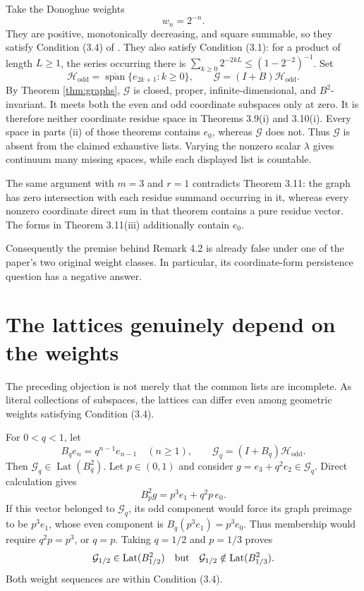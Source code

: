 \documentclass[11pt]{article}
\newcommand{\Hh}{\mathcal H}
\newcommand{\Gg}{\mathcal G}
\newcommand{\Lat}{\operatorname{Lat}}
\begin{document}
Take the Donoghue weights
\[
 w_n=2^{-n}.
\]
They are positive, monotonically decreasing, and square summable, so they
satisfy Condition (3.4) of \cite{LPS}.  They also satisfy Condition (3.1):
for a product of length $L\geq1$, the series occurring there is
$\sum_{k\geq0}2^{-2kL}\leq(1-2^{-2})^{-1}$.  Set
\[
 \Hh_{\mathrm{odd}}=\overline{\operatorname{span}}\{e_{2k+1}:k\geq0\},
 \qquad \Gg=(I+B)\Hh_{\mathrm{odd}}.
\]
By Theorem \ref{thm:graphs}, $\Gg$ is closed, proper,
infinite-dimensional, and $B^2$-invariant.  It meets both the even and odd
coordinate subspaces only at zero.  It is therefore neither coordinate
residue space in Theorems 3.9(i) and 3.10(i).  Every space in parts (ii) of
those theorems contains
$e_0$, whereas $\Gg$ does not.  Thus $\Gg$ is absent from the claimed
exhaustive lists.  Varying the nonzero scalar $\lambda$ gives continuum many
missing spaces, while each displayed list is countable.

The same argument with $m=3$ and $r=1$ contradicts Theorem 3.11: the graph
has zero intersection with each residue summand occurring in it, whereas
every nonzero coordinate direct sum in that theorem contains a pure residue
vector.  The forms in Theorem 3.11(iii) additionally contain $e_0$.

Consequently the premise behind Remark 4.2 is already false under one of the
paper's two original weight classes.  In particular, its coordinate-form
persistence question has a negative answer.

\section{The lattices genuinely depend on the weights}

The preceding objection is not merely that the common lists are incomplete.
As literal collections of subspaces, the lattices can differ even among
geometric weights satisfying Condition (3.4).

For $0<q<1$, let
\[
 B_qe_n=q^{n-1}e_{n-1}\quad(n\geq1),\qquad
 \Gg_q=(I+B_q)\Hh_{\mathrm{odd}}.
\]
Then $\Gg_q\in\Lat(B_q^2)$.  Let $p\in(0,1)$ and consider
$g=e_3+q^2e_2\in\Gg_q$.  Direct calculation gives
\[
 B_p^2g=p^3e_1+q^2p\,e_0.
\]
If this vector belonged to $\Gg_q$, its odd component would force its graph
preimage to be $p^3e_1$, whose even component is
$B_q(p^3e_1)=p^3e_0$.  Thus membership would require $q^2p=p^3$, or
$q=p$.  Taking $q=1/2$ and $p=1/3$ proves
\[
 \Gg_{1/2}\in\Lat(B_{1/2}^2)
 \quad\hbox{but}\quad
 \Gg_{1/2}\notin\Lat(B_{1/3}^2).
\]
Both weight sequences are within Condition (3.4).
\end{document}
